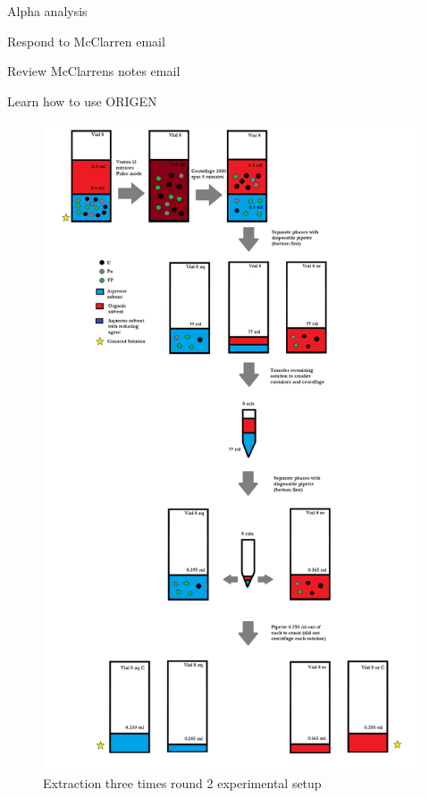 \documentclass[idxtotoc,hyperref,openany,oneside]{labbook} %
\begin{document}

\begin{todolist}
\item{Alpha analysis}
\item{Respond to McClarren email}
\item{Review McClarrens notes email}
\item{Learn how to use ORIGEN}
\end{todolist}

\begin{figure}[H] %
\begin{center}
  \includegraphics[width=0.8\linewidth]
                  {Figures/Cycle_x3_round_2}
\end{center}
\caption{Extraction three times round 2 experimental setup}
\label{fig:example2}
\end{figure}

\end{document}
